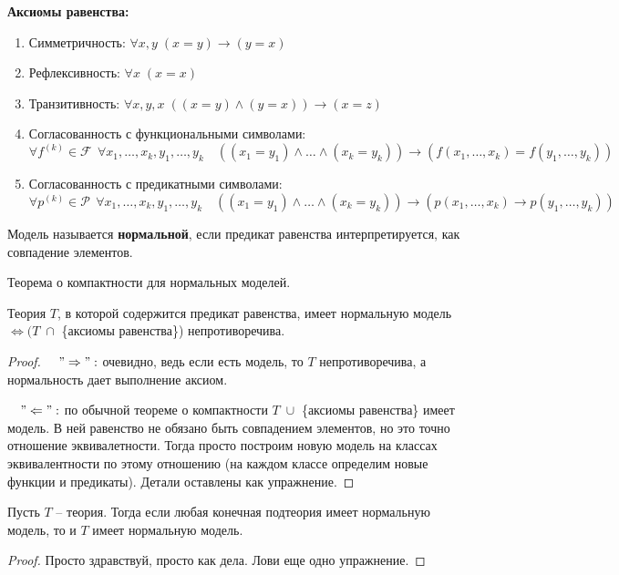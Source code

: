 \textbf{Аксиомы равенства:}
\begin{enumerate}
    \item Симметричность: $\forall x, y \; (x = y) \to (y = x)$
    \item Рефлексивность: $\forall x \; (x = x)$
    \item Транзитивность: $\forall x, y, x \; ((x = y) \land (y = x)) \to (x = z)$
    \item Согласованность с функциональными символами: \[\forall f^{(k)} \in \mathcal{F} \,\; \forall x_1, \dots, x_k, y_1, \dots, y_k \quad ((x_1 = y_1) \land \dots \land (x_k = y_k)) \to (f(x_1, \dots, x_k) = f(y_1, \dots, y_k)) \]
    \item Согласованность с предикатными символами: \[\forall p^{(k)} \in \mathcal{P} \,\; \forall x_1, \dots, x_k, y_1, \dots, y_k \quad ((x_1 = y_1) \land \dots \land (x_k = y_k)) \to (p(x_1, \dots, x_k) \to p(y_1, \dots, y_k)) \]
\end{enumerate}
\begin{conj}
    Модель называется \textbf{нормальной}, если предикат равенства интерпретируется, как совпадение элементов.
\end{conj}
\begin{theorem}
    Теорема о компактности для нормальных моделей.

    Теория $T$, в которой содержится предикат равенства, имеет нормальную модель $\Longleftrightarrow (T \; \cap $ \{аксиомы равенства\}) непротиворечива.
\end{theorem}
\begin{proof}\quad

    $\quad "\Rightarrow":$ очевидно, ведь если есть модель, то $T$ непротиворечива, а нормальность дает выполнение аксиом.

    $\quad "\Leftarrow":$ по обычной теореме о компактности $T \; \cup $ \{аксиомы равенства\} имеет модель. В ней равенство не обязано быть совпадением элементов, но это точно отношение эквивалетности. Тогда просто построим новую модель на классах эквивалентности по этому отношению (на каждом классе определим новые функции и предикаты). Детали оставлены как упражнение.
\end{proof}
\begin{follow}
    Пусть $T$ -- теория. Тогда если любая конечная подтеория имеет нормальную модель, то и $T$ имеет нормальную модель.
\end{follow}
\begin{proof}
    Просто здравствуй, просто как дела. Лови еще одно упражнение.
\end{proof}

